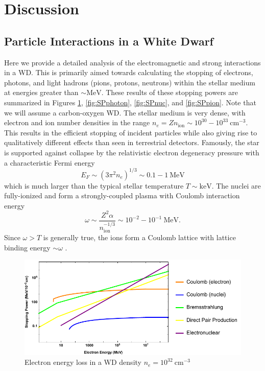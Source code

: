 \documentclass[twocolumn,showpacs,preprintnumbers,amsmath,amssymb,prd]{revtex4}
\newcommand{\MeV}{\text{MeV}}
\newcommand{\keV}{\text{keV}}
\newcommand{\cm}{\text{cm}}
\begin{document}
\section{Discussion}
\label{sec:Discussion}

\begin{appendices}

\section{Particle Interactions in a White Dwarf}
\label{sec:Appendix}
Here we provide a detailed analysis of the electromagnetic and strong interactions in a WD.
This is primarily aimed towards calculating the stopping of electrons, photons, and light hadrons (pions, protons, neutrons) within the stellar medium at energies greater than $\sim \text{MeV}$. 
These results of these stopping powers are summarized in Figures \ref{fig:SPelectron}, \ref{fig:SPphoton}, \ref{fig:SPnuc}, and \ref{fig:SPpion}.
Note that we will assume a carbon-oxygen WD.
The stellar medium is very dense, with electron and ion number densities in the range $n_e = Z n_\text{ion} \sim 10^{30} - 10^{33} ~\cm^{-3}$.  
This results in the efficient stopping of incident particles while also giving rise to qualitatively different effects than seen in terrestrial detectors.  
Famously, the star is supported against collapse by the relativistic electron degeneracy pressure with a characteristic Fermi energy
\begin{equation}
  E_F \sim (3 \pi^2 n_e)^{1/3} \sim 0.1 - 1 ~\MeV
\end{equation}
which is much larger than the typical stellar temperature $T \sim \keV$. 
The nuclei are fully-ionized and form a strongly-coupled plasma with Coulomb interaction energy
\begin{equation}
\label{eq:lattice}
  \omega \sim \frac{Z^2 \alpha}{n_\text{ion}^{-1/3}} 
         \sim 10^{-2} - 10^{-1} ~\MeV.
\end{equation}
Since $\omega >T$ is generally true, the ions form a Coulomb lattice with lattice binding energy $\sim \omega$ \cite{Teukolsky}. 
\begin{figure}
\includegraphics[scale=.60]{SPelectron.pdf}
\caption{Electron energy loss in a WD density $n_e = 10^{32} ~\text{cm}^{-3}$}
\label{fig:SPelectron}
\end{figure}


\end{appendices}
\end{document}
